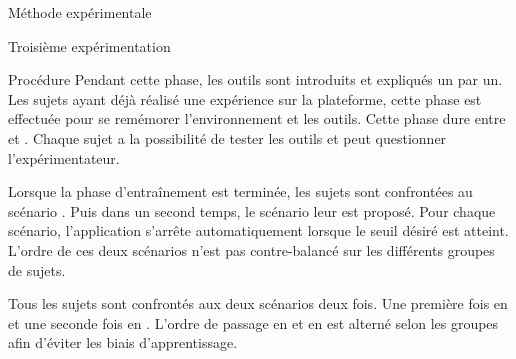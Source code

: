 \documentclass[myfrancais,ngerman,english,frenchb]{mythesis}
\begin{document}
\begin{mychapter}{Méthode expérimentale}
\begin{mysection}{Troisième expérimentation}
\begin{mysubsection}{Procédure}
				Pendant cette phase, les outils sont introduits et expliqués un par un.
				Les sujets ayant déjà réalisé une expérience sur la plateforme, cette phase est effectuée pour se remémorer l'environnement et les outils.
				Cette phase dure entre  et .
				Chaque sujet a la possibilité de tester les outils et peut questionner l'expérimentateur.

				Lorsque la phase d'entraînement est terminée, les sujets sont confrontées au scénario .
				Puis dans un second temps, le scénario  leur est proposé.
				Pour chaque scénario, l'application s'arrête automatiquement lorsque le seuil   désiré est atteint.
				L'ordre de ces deux scénarios n'est pas contre-balancé sur les différents groupes de sujets.

				Tous les sujets sont confrontés aux deux scénarios deux fois.
				Une première fois en  et une seconde fois en .
				L'ordre de passage en  et en  est alterné selon les groupes afin d'éviter les biais d'apprentissage.


\end{mysubsection}
\end{mysection}
\end{mychapter}
\end{document}
